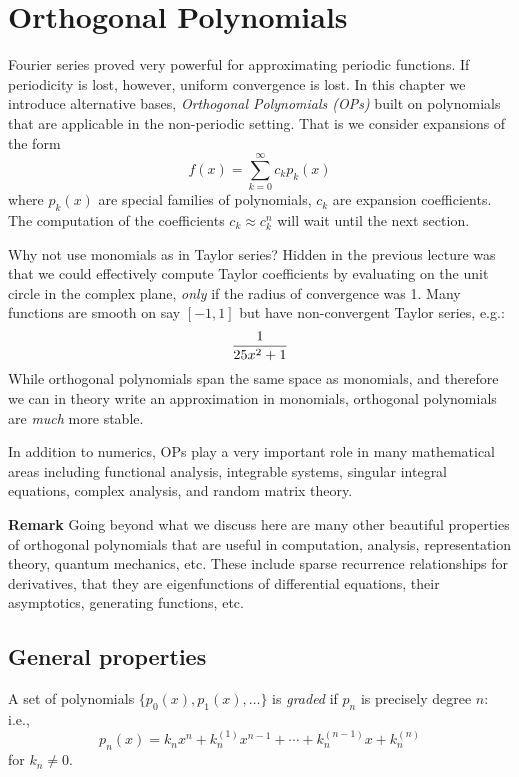 
\section{Orthogonal Polynomials}
Fourier series proved very powerful for approximating periodic functions. If periodicity is lost, however, uniform convergence is lost. In this chapter we introduce alternative bases, \emph{Orthogonal Polynomials (OPs)} built on polynomials that are applicable in the non-periodic setting. That is we consider expansions of the form
\[
f(x) = \sum_{k=0}^\ensuremath{\infty} c_k p_k(x)
\]
where $p_k(x)$ are special families of polynomials, $c_k$ are expansion coefficients. The computation of the coefficients $c_k \ensuremath{\approx} c_k^n$ will wait until the next section.

Why not use monomials as in Taylor series? Hidden in the previous lecture was that we could effectively compute Taylor coefficients by evaluating on the unit circle in the complex plane, \emph{only} if the radius of convergence was 1. Many functions are smooth on say $[-1,1]$ but have non-convergent Taylor series, e.g.:
\[
{1 \over 25x^2 + 1}
\]
While orthogonal polynomials span the same space as monomials, and therefore we can in theory write an approximation in monomials, orthogonal polynomials are \emph{much} more stable.

In addition to numerics, OPs play a very important role in many mathematical areas including functional analysis, integrable systems, singular integral equations, complex analysis, and random matrix theory.

\textbf{Remark} Going beyond what we discuss here are many other beautiful properties of orthogonal polynomials that are useful in computation, analysis, representation theory, quantum mechanics, etc. These include sparse recurrence relationships for derivatives, that they are eigenfunctions of differential equations, their asymptotics, generating functions, etc.

\subsection{General properties}
\begin{definition} A set of polynomials $\{p_0(x), p_1(x), \ensuremath{\ldots} \}$ is \emph{graded} if $p_n$ is precisely degree $n$: i.e.,
\[
p_n(x) = k_n x^n + k_n^{(1)} x^{n-1} + \ensuremath{\cdots} + k_n^{(n-1)} x + k_n^{(n)}
\]
for $k_n \ensuremath{\neq} 0$. \end{definition}

